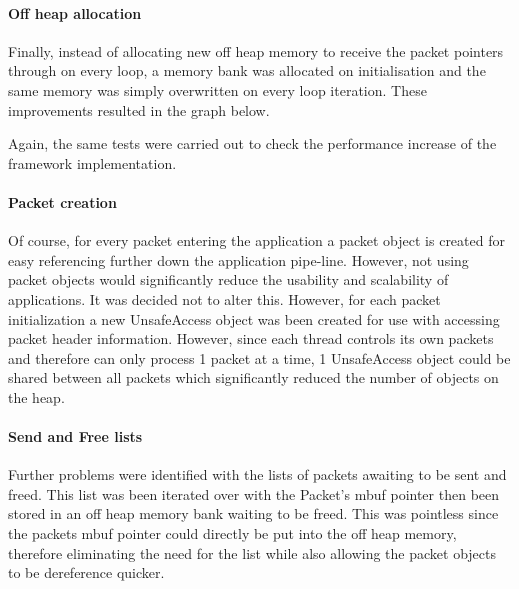 \documentclass[final_report.tex]{subfiles}
\begin{document}
\paragraph*{Off heap allocation}
Finally, instead of allocating new off heap memory to receive the packet pointers through on every loop, a memory bank was allocated on initialisation and the same memory was simply overwritten on every loop iteration. These improvements resulted in the graph below.

Again, the same tests were carried out to check the performance increase of the framework implementation.




\paragraph*{Packet creation}
Of course, for every packet entering the application a packet object is created for easy referencing further down the application pipe-line. However, not using packet objects would significantly reduce the usability and scalability of applications. It was decided not to alter this. However, for each packet initialization a new UnsafeAccess object was been created for use with accessing packet header information. However, since each thread controls its own packets and therefore can only process 1 packet at a time, 1 UnsafeAccess object could be shared between all packets which significantly reduced the number of objects on the heap.

\paragraph*{Send and Free lists} Further problems were identified with the lists of packets awaiting to be sent and freed. This list was been iterated over with the Packet's mbuf pointer then been stored in an off heap memory bank waiting to be freed. This was pointless since the packets mbuf pointer could directly be put into the off heap memory, therefore eliminating the need for the list while also allowing the packet objects to be dereference quicker.


\end{document}
